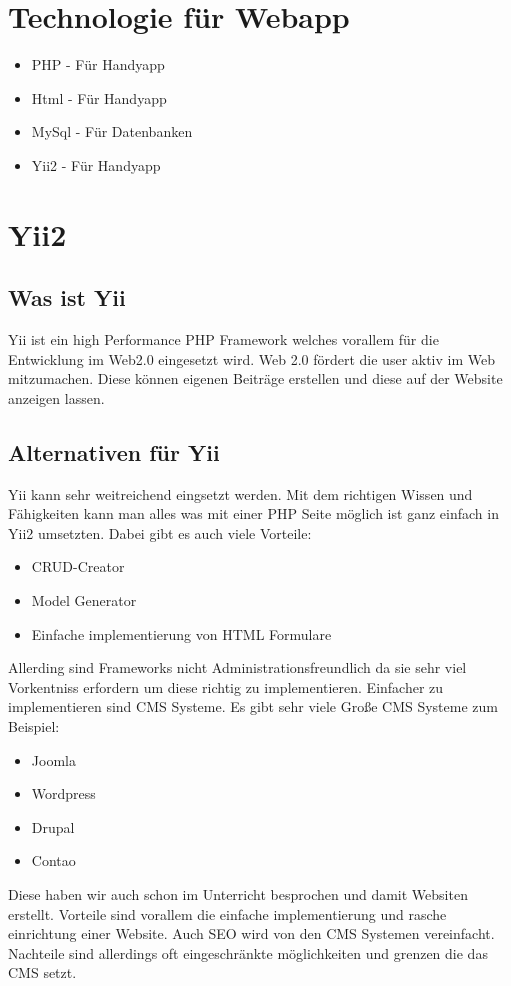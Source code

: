 \newpage	
\def \currentAuthor {Florian Tipotsch}
	\section{Technologie für Webapp}
\begin{itemize}
	\item PHP - Für Handyapp
	\item Html - Für Handyapp 	
	\item MySql - Für Datenbanken
	\item Yii2 - Für Handyapp
\end{itemize}
	\section{Yii2}
	\subsection{Was ist Yii}
	Yii ist ein high Performance PHP Framework welches vorallem für die Entwicklung im Web2.0 eingesetzt wird. Web 2.0 fördert die user aktiv im Web mitzumachen. Diese können eigenen Beiträge erstellen und diese auf der Website anzeigen lassen.
\cite{Web2}
	\subsection{Alternativen für Yii}
	Yii kann sehr weitreichend eingsetzt werden. Mit dem richtigen Wissen und Fähigkeiten kann man alles was mit einer PHP Seite möglich ist ganz einfach in Yii2 umsetzten. Dabei gibt es auch viele Vorteile:
\begin{itemize}
\item CRUD-Creator
\item Model Generator
\item Einfache implementierung von HTML Formulare
\end{itemize}
Allerding sind Frameworks nicht Administrationsfreundlich da sie sehr viel Vorkentniss erfordern um diese richtig zu implementieren. Einfacher zu implementieren sind CMS Systeme. Es gibt sehr viele Große CMS Systeme zum Beispiel:
\begin{itemize}
\item Joomla
\item Wordpress
\item Drupal
\item Contao
\end{itemize}
Diese haben wir auch schon im Unterricht besprochen und damit Websiten erstellt. Vorteile sind vorallem die einfache implementierung und rasche einrichtung einer Website. Auch SEO wird von den CMS Systemen vereinfacht. Nachteile sind allerdings oft eingeschränkte möglichkeiten und grenzen die das CMS setzt.

